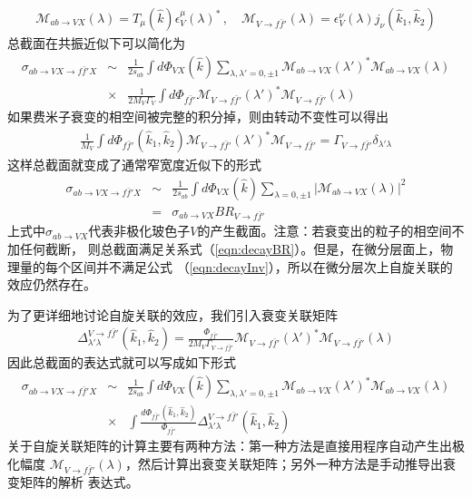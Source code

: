 \begin{eqnarray}
\mathcal{M}_{ab\to VX}(\lambda) = T_{\mu}(\hat k)\epsilon^{\mu}_V(\lambda)^*\,, \quad
\mathcal{M}_{V\to f\bar f'}(\lambda) = \epsilon^{\nu}_V(\lambda) j_{\nu}(\hat k_1,\hat k_2)
\end{eqnarray}
总截面在共振近似下可以简化为
\begin{eqnarray}
\sigma_{ab\to VX\to f\bar f'X} &\sim& \frac{1}{2s_{ab}}\int d\Phi_{VX}(\hat k) 
\sum\limits_{\lambda,\lambda'=0,\pm 1} \mathcal{M}_{ab\to VX}(\lambda')^* \mathcal{M}_{ab\to VX}(\lambda)
\nonumber \\
&\times& \frac{1}{2M_V\Gamma_V}\int d\Phi_{f\bar f'}\mathcal{M}_{V\to f\bar f'}(\lambda')^*
\mathcal{M}_{V\to f\bar f'}(\lambda)
\end{eqnarray}
如果费米子衰变的相空间被完整的积分掉，则由转动不变性可以得出
\begin{eqnarray}
\frac{1}{M_V}\int d\Phi_{f\bar f'}(\hat k_1,\hat k_2) \mathcal{M}_{V\to f\bar f'}(\lambda')^*
\mathcal{M}_{V\to f\bar f'} = \Gamma_{V\to f\bar f'} \delta_{\lambda'\lambda}
\label{eqn:decayInv}
\end{eqnarray}
这样总截面就变成了通常窄宽度近似下的形式
\begin{eqnarray}
\sigma_{ab\to VX\to f\bar f'X} &\sim& \frac{1}{2s_{ab}}\int d\Phi_{VX}(\hat k) 
\sum\limits_{\lambda=0,\pm 1} |\mathcal{M}_{ab\to VX} (\lambda)|^2 \nonumber \\
&=& \sigma_{ab\to VX} BR_{V\to f\bar f'}
\label{eqn:decayBR}
\end{eqnarray}
上式中$\sigma_{ab\to VX}$代表非极化玻色子$V$的产生截面。注意：若衰变出的粒子的相空间不加任何截断，
则总截面满足关系式（\ref{eqn:decayBR}）。但是，在微分层面上，物理量的每个区间并不满足公式
（\ref{eqn:decayInv}），所以在微分层次上自旋关联的效应仍然存在。

为了更详细地讨论自旋关联的效应，我们引入衰变关联矩阵
\begin{eqnarray}
\Delta^{V\to f\bar f'}_{\lambda'\lambda}(\hat k_1,\hat k_2) = \frac{\Phi_{f\bar f'}}{2M_V
\Gamma_{V\to f\bar f'}}\mathcal{M}_{V\to f\bar f'}(\lambda')^* \mathcal{M}_{V\to f\bar f'}(\lambda)
\end{eqnarray}
因此总截面的表达式就可以写成如下形式
\begin{eqnarray}
\sigma_{ab\to VX\to f\bar f'X} &\sim& \frac{1}{2s_{ab}}\int d\Phi_{VX}(\hat k)
\sum\limits_{\lambda,\lambda'= 0,\pm 1}\mathcal{M}_{ab\to VX}(\lambda')^* \mathcal{M}_{ab\to VX}(\lambda)
\nonumber \\
&\times& \int \frac{d\Phi_{f\bar f'}(\hat k_1,\hat k_2)}{\Phi_{f\bar f'}}
\Delta^{V\to f\bar f'}_{\lambda'\lambda}(\hat k_1,\hat k_2)
\end{eqnarray}
关于自旋关联矩阵的计算主要有两种方法：第一种方法是直接用程序自动产生出极化幅度
$\mathcal{M}_{V\to f\bar f'}(\lambda)$，然后计算出衰变关联矩阵；另外一种方法是手动推导出衰变矩阵的解析
表达式。


